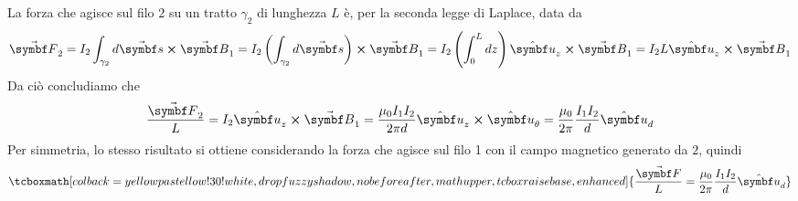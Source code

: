La forza che agisce sul filo $2$ su un tratto $\gamma_2$ di lunghezza $L$ è, per la seconda legge di Laplace, data da
\begin{equation*}
	\vba{F}_2=I_2\int_{\gamma_2}d\vba{s}\cross\vba{B}_1=I_2\left(\int_{\gamma_2}d\vba{s}\right)\cross\vba{B}_1=I_2\left(\int_{0}^Ldz\right)\vbh{u}_z\cross\vba{B}_1=I_2L\vbh{u}_z\cross\vba{B}_1
\end{equation*}
Da ciò concludiamo che 
\begin{equation*}
	\frac{\vba{F}_2}{L}=I_2\vbh{u}_z\cross\vba{B}_1=\frac{\mu_0 I_1 I_2}{2\pi d}\vbh{u}_z\cross\vbh{u}_{\theta}=\frac{\mu_0}{2\pi}\frac{I_1I_2}{d}\vbh{u}_d
\end{equation*}
Per simmetria, lo stesso risultato si ottiene considerando la forza che agisce sul filo 1 con il campo magnetico generato da $2$, quindi
\begin{equation}
	\tcboxmath[colback=yellowpastellow!30!white, drop fuzzy shadow, nobeforeafter, math upper, tcbox raise base, enhanced]{\frac{\vba{F}}{L}=\frac{\mu_0}{2\pi}\frac{I_1I_2}{d}\vbh{u}_d}
\end{equation}
